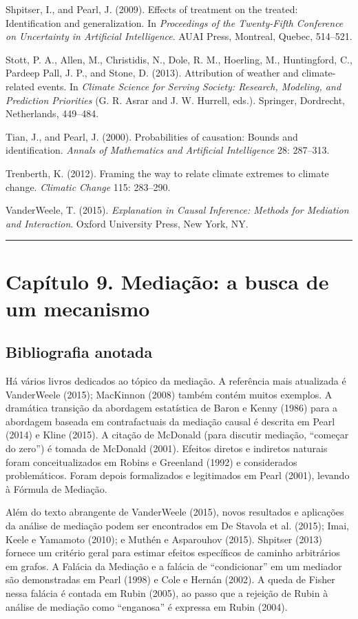 \documentclass[11pt,a5paper,twoside]{book}
\begin{document}
Shpitser, I., and Pearl, J. (2009). Effects of treatment on the treated: Identification and generalization. In \textit{Proceedings of the Twenty-Fifth Conference on Uncertainty in Artificial Intelligence}. AUAI Press, Montreal, Quebec, 514–521.

Stott, P. A., Allen, M., Christidis, N., Dole, R. M., Hoerling, M., Huntingford, C., Pardeep Pall, J. P., and Stone, D. (2013). Attribution of weather and climate-related events. In \textit{Climate Science for Serving Society: Research, Modeling, and Prediction Priorities} (G. R. Asrar and J. W. Hurrell, eds.). Springer, Dordrecht, Netherlands, 449–484.

Tian, J., and Pearl, J. (2000). Probabilities of causation: Bounds and identification. \textit{Annals of Mathematics and Artificial Intelligence} 28: 287–313.

Trenberth, K. (2012). Framing the way to relate climate extremes to climate change. \textit{Climatic Change} 115: 283–290.

VanderWeele, T. (2015). \textit{Explanation in Causal Inference: Methods for Mediation and Interaction}. Oxford University Press, New York, NY.

\vspace{1em}\hrule\vspace{1em}
\section{Capítulo 9. Mediação: a busca de um mecanismo}
\subsection{Bibliografia anotada}
Há vários livros dedicados ao tópico da mediação. A referência mais atualizada é VanderWeele (2015); MacKinnon (2008) também contém muitos exemplos. A dramática transição da abordagem estatística de Baron e Kenny (1986) para a abordagem baseada em contrafactuais da mediação causal é descrita em Pearl (2014) e Kline (2015). A citação de McDonald (para discutir mediação, “começar do zero”) é tomada de McDonald (2001). Efeitos diretos e indiretos naturais foram conceitualizados em Robins e Greenland (1992) e considerados problemáticos. Foram depois formalizados e legitimados em Pearl (2001), levando à Fórmula de Mediação.

Além do texto abrangente de VanderWeele (2015), novos resultados e aplicações da análise de mediação podem ser encontrados em De Stavola et al. (2015); Imai, Keele e Yamamoto (2010); e Muthén e Asparouhov (2015). Shpitser (2013) fornece um critério geral para estimar efeitos específicos de caminho arbitrários em grafos. A Falácia da Mediação e a falácia de “condicionar” em um mediador são demonstradas em Pearl (1998) e Cole e Hernán (2002). A queda de Fisher nessa falácia é contada em Rubin (2005), ao passo que a rejeição de Rubin à análise de mediação como “enganosa” é expressa em Rubin (2004).
\end{document}
